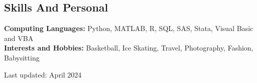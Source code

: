 \documentclass[margin,line]{resume}
\begin{document}
\begin{resume}
    \section{\mysidestyle Skills And Personal}
    \textbf{Computing Languages:} Python, MATLAB, R, SQL, SAS, Stata, Visual Basic and VBA\\
    \textbf{Interests and Hobbies:} Basketball, Ice Skating, Travel, Photography, Fashion, Babysitting


%
%

\hfill 
\scriptsize Last updated: April 2024
\end{resume}   
\end{document}
